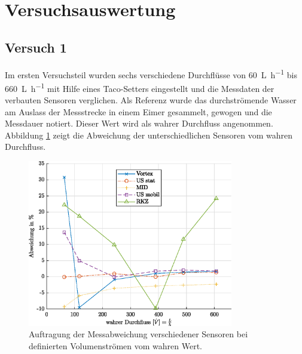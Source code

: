 \section{Versuchsauswertung}

\subsection{Versuch 1}
Im ersten Versuchsteil wurden sechs verschiedene Durchflüsse von \SI{60}{\liter\per\hour} bis \SI{660}{\liter\per\hour} mit Hilfe eines Taco-Setters eingestellt und die Messdaten der verbauten Sensoren verglichen. Als Referenz wurde das durchströmende Wasser am Auslass der Messstrecke in einem Eimer gesammelt, gewogen und die Messdauer notiert. Dieser Wert wird als wahrer Durchfluss angenommen. Abbildung \ref{fig:devPc} zeigt die Abweichung der unterschiedlichen Sensoren vom wahren Durchfluss. 

\begin{figure}[H]
	\centering
	\includegraphics[width=0.8\textwidth]{../DATA/devPcPlot.eps}
	\caption[Messabweichung Sensoren]{Auftragung der Messabweichung verschiedener Sensoren bei definierten Volumenströmen vom wahren Wert.}
	\label{fig:devPc}
\end{figure}

